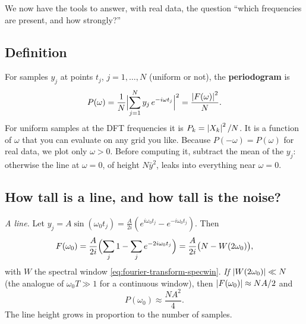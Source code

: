 We now have the tools to answer, with real data, the question ``which frequencies are present, and how strongly?''

\subsection{Definition}

For samples $y_j$ at points $t_j$, $j=1,\dots,N$ (uniform or not), the \textbf{periodogram} is
\begin{equation}
P(\omega)=\frac1N\Bigl|\sum_{j=1}^{N}y_j\,e^{-i\omega t_j}\Bigr|^2=\frac{\left\lvert F(\omega)\right\rvert^2}{N}.
\label{eq:fourier-transform-periodogram}
\end{equation}
For uniform samples at the DFT frequencies it is $P_k=\left\lvert X_k\right\rvert^2/N$. It is a function of $\omega$ that you can evaluate on any grid you like. Because $P(-\omega)=P(\omega)$ for real data, we plot only $\omega>0$. Before computing it, subtract the mean of the $y_j$: otherwise the line at $\omega=0$, of height $N\bar y^2$, leaks into everything near $\omega=0$.

\subsection{How tall is a line, and how tall is the noise?}

\emph{A line.} Let $y_j=A\sin(\omega_0t_j)=\frac{A}{2i}(e^{i\omega_0t_j}-e^{-i\omega_0t_j})$. Then
\begin{equation}
F(\omega_0)=\frac{A}{2i}\Bigl(\sum_j1-\sum_je^{-2i\omega_0t_j}\Bigr)=\frac{A}{2i}\bigl(N-W(2\omega_0)\bigr),
\end{equation}
with $W$ the spectral window \eqref{eq:fourier-transform-specwin}. \emph{If} $\left\lvert W(2\omega_0)\right\rvert\ll N$ (the analogue of $\omega_0T\gg1$ for a continuous window), then $\left\lvert F(\omega_0)\right\rvert\approx NA/2$ and
\begin{equation}
P(\omega_0)\approx\frac{NA^2}{4}.
\label{eq:fourier-transform-lineheight}
\end{equation}
The line height grows in proportion to the number of samples.

